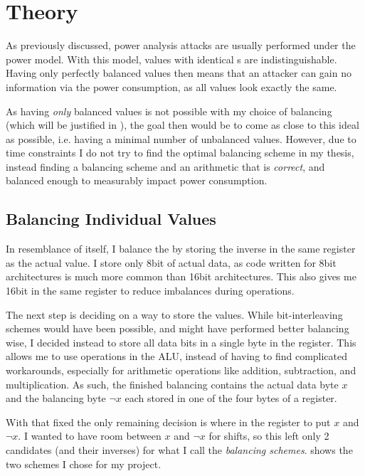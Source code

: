 \chapter{Theory}
\label{theory}
As previously discussed, power analysis attacks are usually performed under the \hammingw{} power model.
With this model, values with identical \hammingw{}s are indistinguishable.
Having only perfectly balanced values then means that an attacker can gain no information via the power consumption, as all values look exactly the same.

As having \emph{only} balanced values is not possible with my choice of balancing (which will be justified in ), the goal then would be to come as close to this ideal as possible, i.e. having a minimal number of unbalanced values.
However, due to time constraints I do not try to find the optimal balancing scheme in my thesis, instead finding a balancing scheme and an arithmetic that is \emph{correct}, and balanced enough to measurably impact power consumption.

\section{Balancing Individual Values}
\label{values}
In resemblance of \dual{} itself, I balance the \hammingw{} by storing the inverse in the same register as the actual value.
I store only 8bit of actual data, as code written for 8bit architectures is much more common than 16bit architectures.
This also gives me 16bit in the same register to reduce imbalances during operations.

The next step is deciding on a way to store the values.
While bit-interleaving schemes would have been possible, and might have performed better balancing wise, I decided instead to store all data bits in a single byte in the register.
This allows me to use operations in the ALU, instead of having to find complicated workarounds, especially for arithmetic operations like addition, subtraction, and multiplication.
As such, the finished balancing contains the actual data byte $x$ and the balancing byte $\neg{x}$ each stored in one of the four bytes of a register.

With that fixed the only remaining decision is where in the register to put $x$ and $\neg{x}$.
I wanted to have room between $x$ and $\neg{x}$ for shifts, so this left only 2 candidates (and their inverses) for what I call the \emph{balancing schemes}.
 shows the two schemes I chose for my project.

